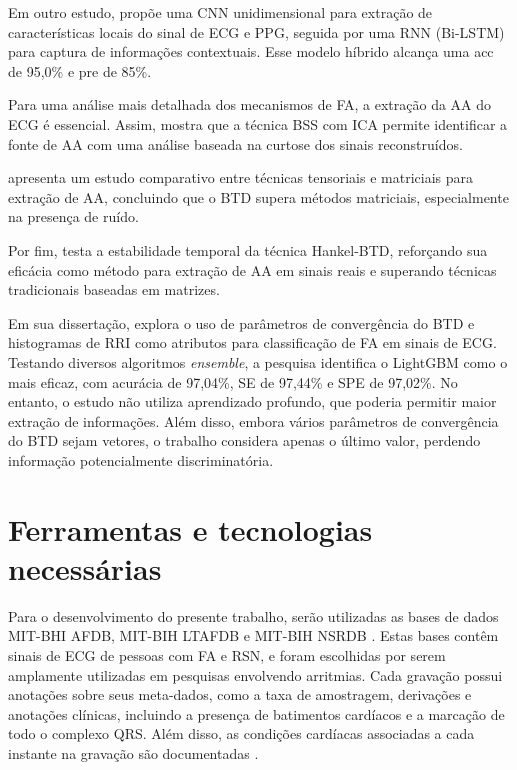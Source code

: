 Em outro estudo, \cite{aldughayfiqDeepLearningApproach2023} propõe uma CNN unidimensional para extração de características locais do sinal de \gls{ECG} e PPG, seguida por uma \gls{RNN} (Bi-LSTM) para captura de informações contextuais. Esse modelo híbrido alcança uma \gls{acc} de 95,0\% e \gls{pre} de 85\%.

Para uma análise mais detalhada dos mecanismos de \gls{FA}, a extração da \gls{AA} do \gls{ECG} é essencial. Assim, \cite{rietaAtrialActivityExtraction2004} mostra que a técnica \gls{BSS} com \gls{ICA} permite identificar a fonte de \gls{AA} com uma análise baseada na curtose dos sinais reconstruídos.

\cite{ribeiroAtrialSignalExtraction2015} apresenta um estudo comparativo entre técnicas tensoriais e matriciais para extração de \gls{AA}, concluindo que o \gls{BTD} supera métodos matriciais, especialmente na presença de ruído.

Por fim, \cite{deoliveiraTemporalStabilityBlock2018} testa a estabilidade temporal da técnica Hankel-\gls{BTD}, reforçando sua eficácia como método para extração de \gls{AA} em sinais reais e superando técnicas tradicionais baseadas em matrizes.

Em sua dissertação, \cite{cardosoDETECCAOFIBRILACAOATRIAL2024} explora o uso de parâmetros de convergência do \gls{BTD} e histogramas de \gls{RRI} como atributos para classificação de \gls{FA} em sinais de \gls{ECG}. Testando diversos algoritmos \textit{ensemble}, a pesquisa identifica o \gls{LightGBM} como o mais eficaz, com acurácia de 97,04\%, \gls{SE} de 97,44\% e \gls{SPE} de 97,02\%. No entanto, o estudo não utiliza aprendizado profundo, que poderia permitir maior extração de informações. Além disso, embora vários parâmetros de convergência do \gls{BTD} sejam vetores, o trabalho considera apenas o último valor, perdendo informação potencialmente discriminatória.



\section{Ferramentas e tecnologias necessárias}
\label{sec:ferramentas}

Para o desenvolvimento do presente trabalho, serão utilizadas as bases de dados MIT-BHI \gls{AFDB}, MIT-BIH \gls{LTAFDB} e MIT-BIH \gls{NSRDB} \cite{goldberger2000physiobank}. Estas bases contêm sinais de \gls{ECG} de pessoas com \gls{FA} e \gls{RSN}, e foram escolhidas por serem amplamente utilizadas em pesquisas envolvendo arritmias. Cada gravação possui anotações sobre seus meta-dados, como a taxa de amostragem, derivações e anotações clínicas, incluindo a presença de batimentos cardíacos e a marcação de todo o complexo QRS. Além disso, as condições cardíacas associadas a cada instante na gravação são documentadas \cite{goldberger2000physiobank}.

